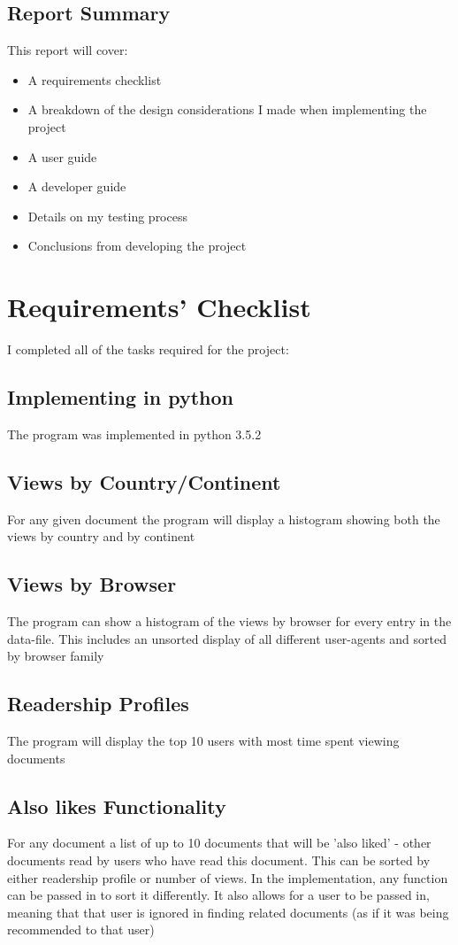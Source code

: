 \documentclass[12pt]{report}
\begin{document}
\section{Report Summary}
This report will cover:
\begin{itemize}
\item{A requirements checklist}
\item{A breakdown of the design considerations I made when implementing the project}
\item{A user guide}
\item{A developer guide}
\item{Details on my testing process}
\item{Conclusions from developing the project}
\end{itemize} 



\chapter{Requirements' Checklist}
I completed all of the tasks required for the project:

\section{Implementing in python}
The program was implemented in python 3.5.2
\section{Views by Country/Continent}
For any given document the program will display a histogram showing both the views by country and by continent
\section{Views by Browser}
The program can show a histogram of the views by browser for every entry in the data-file.  This includes an unsorted display of all different user-agents and sorted by browser family
\section{Readership Profiles}
The program will display the top 10 users with most time spent viewing documents
\section{Also likes Functionality}
For any document a list of up to 10 documents that will be 'also liked' - other documents read by  users who have read this document.  This can be sorted by either readership profile or number of views.  In the implementation, any function can be passed in to sort it differently.  It also allows for a user to be passed in, meaning that that user is ignored in finding related documents (as if it was being recommended to that user)
\end{document}
